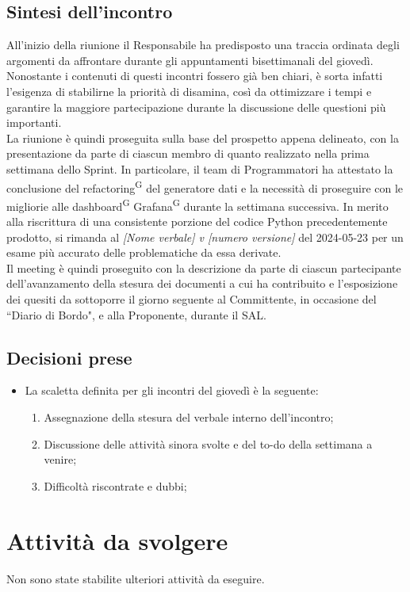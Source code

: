 \documentclass[8pt]{article}
\newcommand{\glossterm}[1]{#1\textsuperscript{G}} %
\begin{document}
\subsection{Sintesi dell'incontro}
All'inizio della riunione il Responsabile ha predisposto una traccia ordinata degli argomenti da affrontare durante gli appuntamenti bisettimanali del giovedì. Nonostante i contenuti di questi incontri fossero già ben chiari, è sorta infatti l'esigenza di stabilirne la priorità di disamina, così da ottimizzare i tempi e garantire la maggiore partecipazione durante la discussione delle questioni più importanti. \\ La riunione è quindi proseguita sulla base del prospetto appena delineato, con la presentazione da parte di ciascun membro di quanto realizzato nella prima settimana dello Sprint. In particolare, il team di Programmatori ha attestato la conclusione del \glossterm{refactoring} %
del generatore dati e la necessità di proseguire con le migliorie alle \glossterm{dashboard} \glossterm{Grafana} durante la settimana successiva.
In merito alla riscrittura di una consistente porzione del codice Python precedentemente prodotto, si rimanda al \textit{[Nome verbale] v [numero versione]} del 2024-05-23 per un esame più accurato delle problematiche da essa derivate. \\
Il meeting è quindi proseguito con la descrizione da parte di ciascun partecipante dell'avanzamento della stesura dei documenti a cui ha contribuito e l'esposizione dei quesiti da sottoporre il giorno seguente al Committente, in occasione del ``Diario di Bordo", e alla Proponente, durante il SAL.

\subsection{Decisioni prese}
\begin{itemize}
	\setlength\itemsep{0em}
	\item La scaletta definita per gli incontri del giovedì è la seguente:
        \begin{enumerate}
            \item Assegnazione della stesura del verbale interno dell'incontro;
            \item Discussione delle attività sinora svolte e del to-do della settimana a venire;
            \item Difficoltà riscontrate e dubbi;
        \end{enumerate}
\end{itemize}
\newpage
\section{Attività da svolgere}
Non sono state stabilite ulteriori attività da eseguire.
\end{document}

